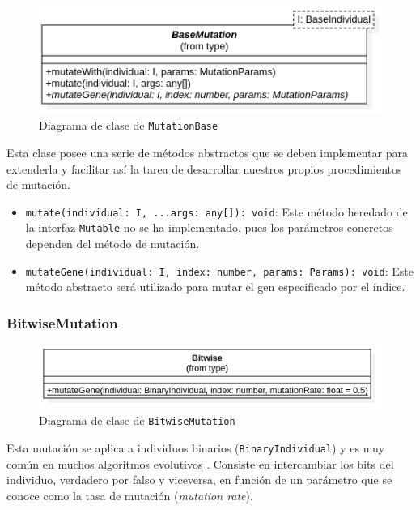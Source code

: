 \begin{figure}[ht]
    \centering
    \includegraphics[scale=0.4]{mem/images/cap-4/4.2.7(Mutation)/BaseMutation.png}
    \caption{Diagrama de clase de \texttt{MutationBase}}
    \label{fig:my_label}
\end{figure}

Esta clase posee una serie de métodos abstractos que se deben implementar para extenderla y facilitar así la tarea de desarrollar nuestros propios procedimientos de mutación.

\begin{itemize}
    \item \texttt{mutate(individual: I, ...args: any[]): void}: Este método heredado de la interfaz \texttt{Mutable} no se ha implementado, pues los parámetros concretos dependen del método de mutación.
    \item \texttt{mutateGene(individual: I, index: number, params: Params): void}: Este método abstracto será utilizado para mutar el gen especificado por el índice.
\end{itemize}

\subsubsection{BitwiseMutation}

\begin{figure}[ht]
    \centering
    \includegraphics[scale=0.4]{mem/images/cap-4/4.2.7(Mutation)/Bitwise.png}
    \caption{Diagrama de clase de \texttt{BitwiseMutation}}
    \label{fig:my_label}
\end{figure}

Esta mutación se aplica a individuos binarios (\texttt{BinaryIndividual}) y es muy común en muchos algoritmos evolutivos \cite{holland1992adaptation}. Consiste en intercambiar los bits del individuo, verdadero por falso y viceversa, en función de un parámetro que se conoce como la tasa de mutación (\textit{mutation rate}). \\

